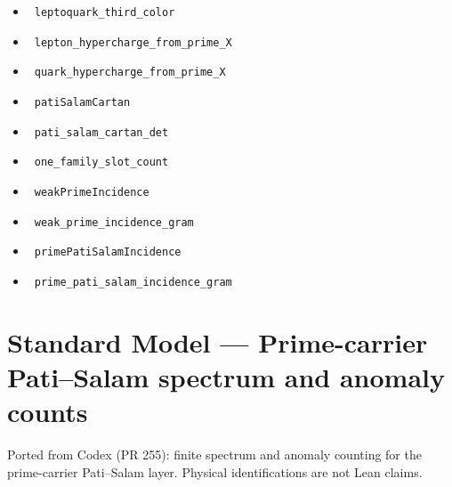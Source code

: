 \documentclass{report}
\theoremstyle{definition}
\begin{document}
\begin{itemize}
  \item {}\leanok\ \texttt{leptoquark\_third\_color}
  \item {}\leanok\ \texttt{lepton\_hypercharge\_from\_prime\_X}
  \item {}\leanok\ \texttt{quark\_hypercharge\_from\_prime\_X}
  \item {}\leanok\ \texttt{patiSalamCartan}
  \item {}\leanok\ \texttt{pati\_salam\_cartan\_det}
  \item {}\leanok\ \texttt{one\_family\_slot\_count}
  \item {}\leanok\ \texttt{weakPrimeIncidence}
  \item {}\leanok\ \texttt{weak\_prime\_incidence\_gram}
  \item {}\leanok\ \texttt{primePatiSalamIncidence}
  \item {}\leanok\ \texttt{prime\_pati\_salam\_incidence\_gram}
\end{itemize}

\section{Standard Model --- Prime-carrier Pati--Salam spectrum and anomaly counts}
Ported from Codex (PR 255): finite spectrum and anomaly counting for the prime-carrier Pati--Salam layer. Physical identifications are not Lean claims.
\end{document}

